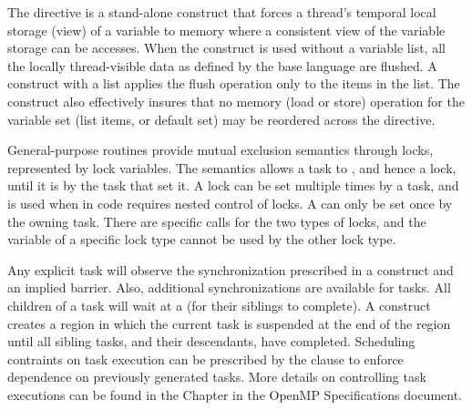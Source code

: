 The  directive is a stand-alone construct that forces a thread's 
temporal local storage (view) of a variable to memory where a consistent view
of the variable storage can be accesses.  When the construct is used without 
a variable list, all the locally thread-visible data as defined by the 
base language are flushed.  A construct with a list applies the flush 
operation only to the items in the list.  The  construct also 
effectively insures that no memory (load or store) operation for
the variable set (list items, or default set) may be reordered across 
the  directive. 

General-purpose routines provide mutual exclusion semantics through locks, 
represented by lock variables.  
The semantics allows a task to , and hence 
 a lock, until it is  by the task that set it. A 
 lock can be set multiple times by a task, and is used
when in code requires nested control of locks.  A  can
only be set once by the owning task. There are specific calls for the two
types of locks, and the variable of a specific lock type cannot be used by the
other lock type.  

Any explicit task will observe the synchronization prescribed in a 
 construct and an implied barrier.  Also, additional synchronizations 
are available for tasks.  All children of a task will wait at a  (for 
their siblings to complete).  A  construct creates a region in which the
current task is suspended at the end of the region until all sibling tasks, 
and their descendants, have completed. 
Scheduling contraints on task execution can be prescribed by the 
clause to enforce dependence on previously generated tasks.
More details on controlling task executions can be found in the  Chapter
in the OpenMP Specifications document. %
